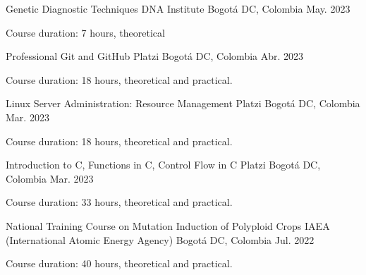 \begin{cventries}

\cventry
{Genetic Diagnostic Techniques} %
{DNA Institute} %
{Bogotá DC, Colombia} %
{May. 2023} %
{ %
\begin{cvitems}
\item {Course duration: 7 hours, theoretical}
\end{cvitems}
}


\cventry
{Professional Git and GitHub} %
{Platzi} %
{Bogotá DC, Colombia} %
{Abr. 2023} %
{ %
\begin{cvitems}
\item {Course duration: 18 hours, theoretical and practical.}
\end{cvitems}
}


\cventry
{Linux Server Administration: Resource Management} %
{Platzi} %
{Bogotá DC, Colombia} %
{Mar. 2023} %
{ %
\begin{cvitems}
\item {Course duration: 18 hours, theoretical and practical.}
\end{cvitems}
}


\cventry
{Introduction to C, Functions in C, Control Flow in C} %
{Platzi} %
{Bogotá DC, Colombia} %
{Mar. 2023} %
{ %
\begin{cvitems}
\item {Course duration: 33 hours, theoretical and practical.}
\end{cvitems}
}


\cventry
{National Training Course on Mutation Induction of Polyploid Crops} %
{IAEA (International Atomic Energy Agency)} %
{Bogotá DC, Colombia} %
{Jul. 2022} %
{ %
\begin{cvitems}
\item {Course duration: 40 hours, theoretical and practical.}
\end{cvitems}
}


\end{cventries}
